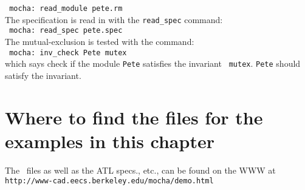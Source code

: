 {\noindent\tt
mocha: read\_module pete.rm
}\\

\noindent
The specification is read in with the {\tt read\_spec} command:\\

{\noindent\tt
mocha: read\_spec pete.spec
}\\

\noindent
The mutual-exclusion is tested with the command:\\

{\noindent\tt
mocha:  inv\_check Pete mutex
}\\

\noindent
which says check if the module {\tt Pete} satisfies the invariant {\tt
mutex}. {\tt Pete} should satisfy the invariant. 

\section{Where to find the files for the examples in this chapter}

The \rem\ files as well as the ATL specs., etc., can be found on the WWW at
{\tt http://www-cad.eecs.berkeley.edu/mocha/demo.html}

